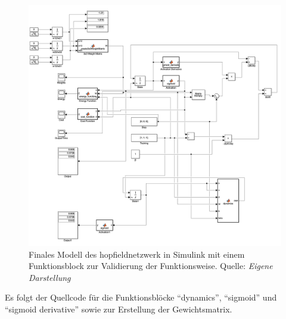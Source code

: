 \begin{figure}[h]
  \includegraphics[width=\textwidth]{abbildungen/hnn_with_proof_simulink.png}
  \caption{Finales Modell des \gls{hopfieldnetzwerk} in Simulink mit einem Funktionsblock zur Validierung der Funktionsweise. Quelle: \textit{Eigene Darstellung}}
  \label{fig:Hopfield-Netzwerk Final Simulink}
\end{figure}

Es folgt der Quellcode für die Funktionsblöcke "`dynamics"', "`sigmoid"' und "`sigmoid derivative"' sowie zur Erstellung der Gewichtsmatrix.





